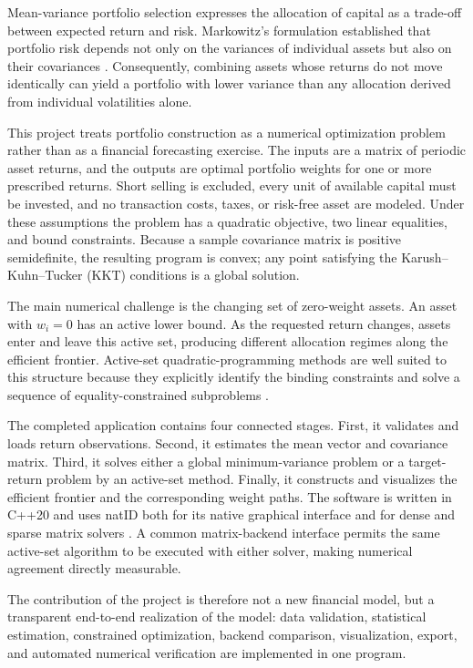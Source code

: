 \documentclass[conference]{IEEEtran}
\begin{document}
Mean-variance portfolio selection expresses the allocation of capital as a
trade-off between expected return and risk. Markowitz's formulation established
that portfolio risk depends not only on the variances of individual assets but
also on their covariances \cite{markowitz1952}. Consequently, combining assets
whose returns do not move identically can yield a portfolio with lower
variance than any allocation derived from individual volatilities alone.

This project treats portfolio construction as a numerical optimization
problem rather than as a financial forecasting exercise. The inputs are a
matrix of periodic asset returns, and the outputs are optimal portfolio
weights for one or more prescribed returns. Short selling is excluded, every
unit of available capital must be invested, and no transaction costs, taxes,
or risk-free asset are modeled. Under these assumptions the problem has a
quadratic objective, two linear equalities, and bound constraints. Because a
sample covariance matrix is positive semidefinite, the resulting program is
convex; any point satisfying the Karush--Kuhn--Tucker (KKT) conditions is a
global solution.

The main numerical challenge is the changing set of zero-weight assets. An
asset with $w_i=0$ has an active lower bound. As the requested return changes,
assets enter and leave this active set, producing different allocation regimes
along the efficient frontier. Active-set quadratic-programming methods are
well suited to this structure because they explicitly identify the binding
constraints and solve a sequence of equality-constrained subproblems
\cite{nocedal2006,goldfarb1983}.

The completed application contains four connected stages. First, it validates
and loads return observations. Second, it estimates the mean vector and
covariance matrix. Third, it solves either a global minimum-variance problem or
a target-return problem by an active-set method. Finally, it constructs and
visualizes the efficient frontier and the corresponding weight paths. The
software is written in C++20 and uses natID both for its native graphical
interface and for dense and sparse matrix solvers \cite{natid}. A common
matrix-backend interface permits the same active-set algorithm to be executed
with either solver, making numerical agreement directly measurable.

The contribution of the project is therefore not a new financial model, but a
transparent end-to-end realization of the model: data validation, statistical
estimation, constrained optimization, backend comparison, visualization,
export, and automated numerical verification are implemented in one program.
\end{document}
